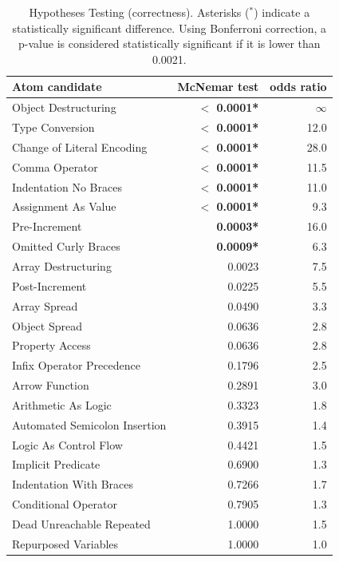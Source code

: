 \begin{table}[tb]
\caption{Hypotheses Testing (correctness). Asterisks ($^{*}$) indicate a statistically significant difference. Using Bonferroni correction, a p-value is considered statistically significant if it is lower than 0.0021.}
 \centering
 \begin{tabular}{lrr}
   \toprule
Atom candidate & McNemar test &      odds ratio \\
\midrule
Object Destructuring      &   \textbf{$<$ 0.0001*} & $\infty$ \\
Type Conversion           &   \textbf{$<$ 0.0001*} & 12.0 \\
Change of Literal Encoding   &   \textbf{$<$ 0.0001*} & 28.0 \\
Comma Operator            &   \textbf{$<$ 0.0001*} & 11.5 \\
Indentation No Braces     &   \textbf{$<$ 0.0001*} &  11.0 \\
Assignment As Value       &   \textbf{$<$ 0.0001*} &  9.3 \\
Pre-Increment              &  \textbf{0.0003*} &    16.0 \\
Omitted Curly Braces      &  \textbf{0.0009*} &  6.3 \\
Array Destructuring       &  0.0023 &     7.5 \\
Post-Increment              &  0.0225 &     5.5 \\
Array Spread              &  0.0490 &    3.3 \\
Object Spread             &  0.0636 &     2.8 \\
Property Access           &  0.0636 &     2.8 \\
Infix Operator Precedence &  0.1796 &     2.5 \\
Arrow Function            &  0.2891 &     3.0 \\
Arithmetic As Logic       &  0.3323 &  1.8 \\
Automated Semicolon Insertion  &  0.3915 &  1.4 \\
Logic As Control Flow     &  0.4421 &  1.5 \\
Implicit Predicate        &  0.6900 &  1.3 \\
Indentation With Braces   &  0.7266 &  1.7 \\
Conditional Operator      &  0.7905 &  1.3 \\
Dead Unreachable Repeated &  1.0000 &     1.5 \\
Repurposed Variables      &   1.0000 &     1.0 \\
\bottomrule
\end{tabular}
\label{tab:repeated:misunderstanding}
\end{table}



